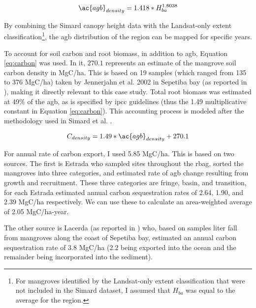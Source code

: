\begin{equation}
\label{eq:allo}
\ac{agb}_{density} = 1.418 * H_{ba}^{1.6038}
\end{equation}

By combining the Simard canopy height data with the Landsat-only extent classification\footnote{For mangroves identified by the Landsat-only extent classification that were not included in the Simard dataset, I assumed that $H_{ba}$ was equal to the average for the region.}, the \ac{agb} distribution of the region can be mapped for specific years.

To account for soil carbon and root biomass, in addition to \ac{agb}, Equation \ref{eq:carbon} was used. In it, $270.1$ represents an estimate of the mangrove soil carbon density in MgC/ha. This is based on 19 samples (which ranged from 135 to 376 MgC/ha) taken by Jennerjahn et al. 2002 \cite{jennerjahnRelevanceMangrovesProduction2002} in Sepetiba bay (as reported in \cite{kristensenOrganicCarbonDynamics2008, atwoodGlobalPatternsMangrove2017}), making it directly relevant to this case study.  Total root biomass was estimated at 49\% of the \ac{agb}, as is specified by \ac{ipcc} guidelines \cite{takahiko2013Supplement20062014} (thus the 1.49 multiplicative constant in Equation \ref{eq:carbon}). This accounting process is modeled after the methodology used in Simard et al. \cite{simardMangroveCanopyHeight2019}.

\begin{equation}
\label{eq:carbon}
C_{density} = 1.49 * \ac{agb}_{density} + 270.1 
\end{equation}

For annual rate of carbon export, I used 5.85 MgC/ha. This is based on two sources. The first is Estrada \cite{estrada2013analise} who sampled sites throughout the \ac{rbag}, sorted the mangroves into three categories, and estimated rate of \ac{agb} change resulting from growth and recruitment. These three categories are fringe, basin, and transition, for each Estrada estimated annual carbon sequestration rates of 2.64, 1.90, and 2.39 MgC/ha respectively. We can use these to calculate an area-weighted average of 2.05 MgC/ha-year. 

The other source is Lacerda \cite{lacerda1992carbon} (as reported in \cite{jennerjahnRelevanceMangrovesProduction2002}) who, based on samples liter fall from mangroves along the coast of Sepetiba bay, estimated an annual carbon sequestration rate of 3.8 MgC/ha (2.2 being exported into the ocean and the remainder being incorporated into the sediment).

